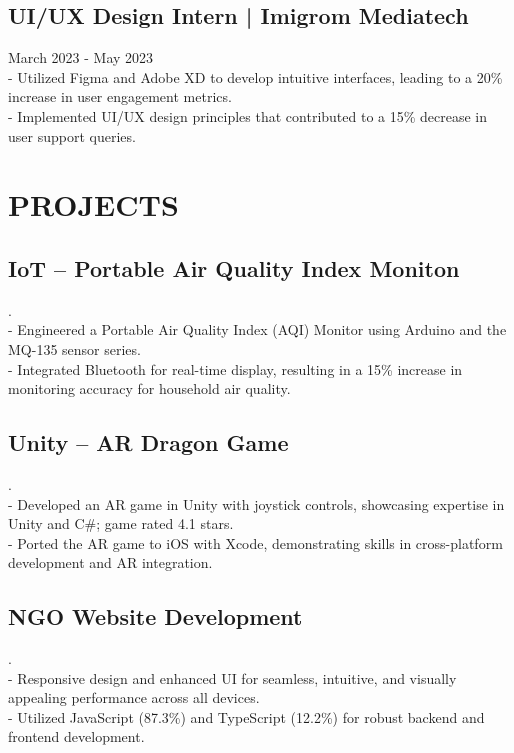 \documentclass[a4paper,10pt]{article}
\begin{document}
\subsection*{UI/UX Design Intern | Imigrom Mediatech} \hfill March 2023 - May 2023
\vspace{4pt}\\
  - Utilized Figma and Adobe XD to develop intuitive interfaces, leading to a 20\% increase in user engagement metrics.\\
  - Implemented UI/UX design principles that contributed to a 15\% decrease in user support queries.
\vspace{3pt}
\section*{PROJECTS}
\vspace{8pt}
\subsection*{IoT – Portable Air Quality Index Moniton}.
\vspace{4pt}\\
  - Engineered a Portable Air Quality Index (AQI) Monitor using Arduino and the MQ-135 sensor series.\\
   - Integrated Bluetooth for real-time display, resulting in a 15\% increase in monitoring accuracy for household air quality.
\vspace{-6pt}

\subsection*{Unity – AR Dragon Game}.
\vspace{4pt}\\
   - Developed an AR game in Unity with joystick controls, showcasing expertise in Unity and C\#; game rated 4.1 stars.\\
- Ported the AR game to iOS with Xcode, demonstrating skills in cross-platform development and AR integration.
\vspace{6pt}

\subsection*{NGO Website Development}.
\vspace{4pt}\\
   - Responsive design and enhanced UI for seamless, intuitive, and visually appealing performance across all devices.\\
   - Utilized JavaScript (87.3\%) and TypeScript (12.2\%) for robust backend and frontend development.
\vspace{6pt}
\end{document}
